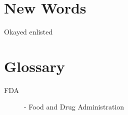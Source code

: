 \documentclass[a4paper]{article}
\begin{document}
\titleTMB 
\newpage


\section{New Words}

Okayed %
enlisted %

\section{Glossary}

\begin{description}
\item[FDA] - Food and Drug Administration
\end{description}
\end{document}
